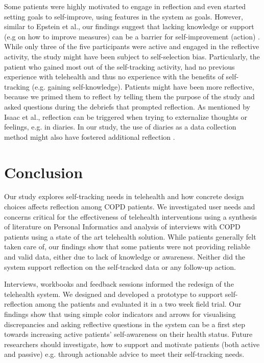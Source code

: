 Some patients were highly motivated to engage in reflection and even started setting goals to self-improve, using features in the system as goals. However, similar to Epstein et al., our findings suggest that lacking knowledge or support (e.g on how to improve measures) can be a barrier for self-improvement (action) \cite{Epstein2015}. While only three of the five participants were active and engaged in the reflective activity, the study might have been subject to self-selection bias. Particularly, the patient who gained most out of the self-tracking activity, had no previous experience with telehealth and thus no experience with the benefits of self-tracking (e.g. gaining self-knowledge). Patients might have been more reflective, because we primed them to reflect by telling them the purpose of the study and asked questions during the debriefs that prompted reflection. As mentioned by Isaac et al., reflection can be triggered when trying to externalize thoughts or feelings, e.g. in diaries. In our study, the use of diaries as a data collection method might also have fostered additional reflection \cite{Isaac}. 
 
\section{Conclusion}
Our study explores self-tracking needs in telehealth and how concrete design choices affects reflection among COPD patients. We investigated user needs and concerns critical for the effectiveness of telehealth interventions using a synthesis of literature on Personal Informatics and analysis of interviews with COPD patients using a state of the art telehealth solution. While patients generally felt taken care of, our findings show that some patients were not providing reliable and valid data, either due to lack of knowledge or awareness. Neither did the system support reflection on the self-tracked data or any follow-up action. 

Interviews, workbooks and feedback sessions informed the redesign of the telehealth system. We designed and developed a prototype to support self-reflection among the patients and evaluated it in a two week field trial. Our findings show that using simple color indicators and arrows for visualising discrepancies and asking reflective questions in the system can be a first step towards increasing active patients' self-awareness on their health status. Future researchers should investigate, how to support and motivate patients (both active and passive) e.g. through actionable advice to meet their self-tracking needs. 
